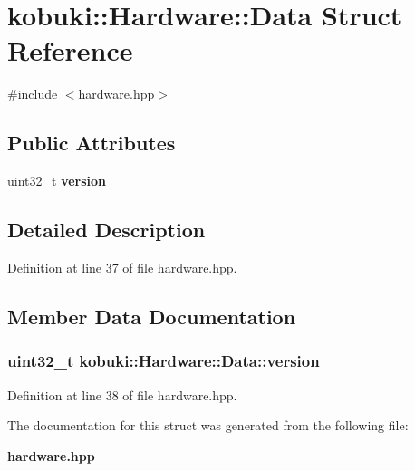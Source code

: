 \section{kobuki\-:\-:\-Hardware\-:\-:\-Data \-Struct \-Reference}
\label{structkobuki_1_1Hardware_1_1Data}


{\ttfamily \#include $<$hardware.\-hpp$>$}

\subsection*{\-Public \-Attributes}
\begin{DoxyCompactItemize}
\item 
uint32\-\_\-t {\bf version}
\end{DoxyCompactItemize}


\subsection{\-Detailed \-Description}


\-Definition at line 37 of file hardware.\-hpp.



\subsection{\-Member \-Data \-Documentation}
\subsubsection[{version}]{\setlength{\rightskip}{0pt plus 5cm}uint32\-\_\-t {\bf kobuki\-::\-Hardware\-::\-Data\-::version}}\label{structkobuki_1_1Hardware_1_1Data_ad8213b45a4780e33dfccc932f07aa0bc}


\-Definition at line 38 of file hardware.\-hpp.



\-The documentation for this struct was generated from the following file\-:\begin{DoxyCompactItemize}
\item 
{\bf hardware.\-hpp}\end{DoxyCompactItemize}
